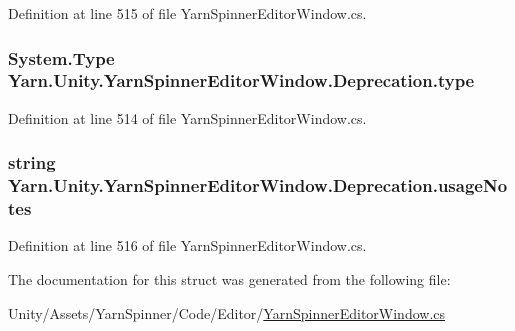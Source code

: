 Definition at line 515 of file Yarn\-Spinner\-Editor\-Window.\-cs.

\hypertarget{a00092_a750904df254223bf3131c39017f90a0b}{
\subsubsection[{type}]{\setlength{\rightskip}{0pt plus 5cm}System.\-Type Yarn.\-Unity.\-Yarn\-Spinner\-Editor\-Window.\-Deprecation.\-type}}\label{a00092_a750904df254223bf3131c39017f90a0b}


Definition at line 514 of file Yarn\-Spinner\-Editor\-Window.\-cs.

\hypertarget{a00092_ac23509be7ae6b43a3e2154dd430954a7}{
\subsubsection[{usage\-Notes}]{\setlength{\rightskip}{0pt plus 5cm}string Yarn.\-Unity.\-Yarn\-Spinner\-Editor\-Window.\-Deprecation.\-usage\-Notes}}\label{a00092_ac23509be7ae6b43a3e2154dd430954a7}


Definition at line 516 of file Yarn\-Spinner\-Editor\-Window.\-cs.



The documentation for this struct was generated from the following file\-:\begin{DoxyCompactItemize}
\item 
Unity/\-Assets/\-Yarn\-Spinner/\-Code/\-Editor/\hyperlink{a00296}{Yarn\-Spinner\-Editor\-Window.\-cs}\end{DoxyCompactItemize}
